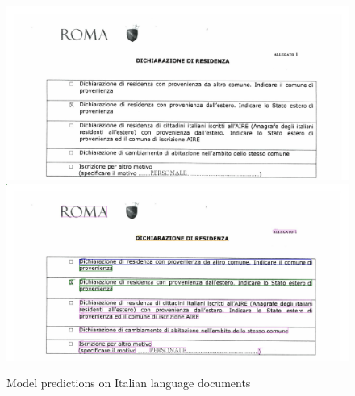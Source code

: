 \begin{figure}[!ht]
\centering
\includegraphics[width=1\textwidth]{chapters/images/experiments_and_results/original/it_val_0.jpg}\hfill
\includegraphics[width=1\textwidth]{chapters/images/experiments_and_results/results/it_val_0.jpg}
% 
\caption{Model predictions on Italian language documents}
    \label{fig:result_lang_it}
\end{figure}

